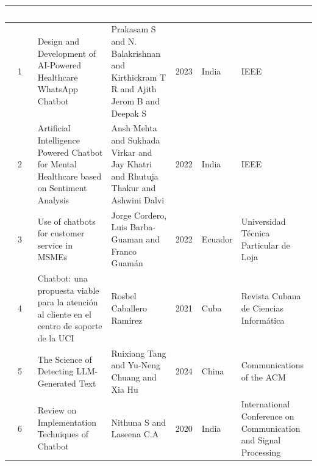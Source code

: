 \begin{table}[h]
	\newcommand{\multirot}[1]{\multirow{2}{*}[-8ex]{\rotcell{\rlap{#1}}}}
	\footnotesize
	\centering
	\begin{tabular}{|m{0.5cm}|m{0.3cm}|m{4cm}|m{2cm}|m{0.6cm}|m{1.7cm}|m{3cm}|} 
		\hline
		\rowcolor[rgb]{0,0.251,0.502} \multicolumn{1}{|c|}{\textcolor{white}{Tipo}} & \multicolumn{1}{c|}{\textcolor{white}{N°}} & \multicolumn{1}{c|}{\textcolor{white}{Título}}                                                                             & \multicolumn{1}{c|}{\textcolor{white}{Autor}}        & \multicolumn{1}{c|}{\textcolor{white}{Año}} & \multicolumn{1}{c|}{\textcolor{white}{País}} & \multicolumn{1}{c|}{\textcolor{white}{Fuente}}                                                        \\ 


		\hline
		\multirot{Problema}
		& 1         
		& Design and Development of AI-Powered Healthcare WhatsApp Chatbot
		& Prakasam S and N. Balakrishnan and Kirthickram T R and Ajith Jerom B and Deepak S
		& 2023
		& India
		& IEEE \\
		\cline{2-7}

		& 2        
		& Artificial Intelligence Powered Chatbot for Mental Healthcare based on Sentiment Analysis
		& Ansh Mehta and Sukhada Virkar and Jay Khatri and Rhutuja Thakur and Ashwini Dalvi
		& 2022
		& India
		& IEEE \\

		\hline
		\multirow{3}{*}[-14ex]{\rotcell{\rlap{Propuesta}}}
		& 3        
		& Use of chatbots for customer
		service in MSMEs
		& Jorge Cordero, Luis Barba-Guaman and Franco Guamán
		& 2022
		& Ecuador
		& Universidad Técnica Particular de Loja \\
		\cline{2-7}
		& 4        
		& Chatbot: una propuesta viable para la atención al cliente en el centro de soporte de la UCI
		& Rosbel Caballero Ramírez
		& 2021
		& Cuba
		& Revista Cubana de Ciencias Informática \\
		
		\hline
		\multirow{4}{*}[-28ex]{\rotcell{\rlap{Técnica}}}
		& 5        
		& The Science of Detecting LLM-Generated Text
		& Ruixiang Tang and Yu-Neng Chuang and Xia Hu
		& 2024
		& China
		& Communications of the ACM \\ 
		\cline{2-7}

		& 6        
		& Review on Implementation Techniques of 
		Chatbot
		& Nithuna S and Laseena C.A
		& 2020
		& India
		& International Conference on Communication and Signal Processing \\ 
		\cline{2-7}


\end{tabular}
\end{table}

